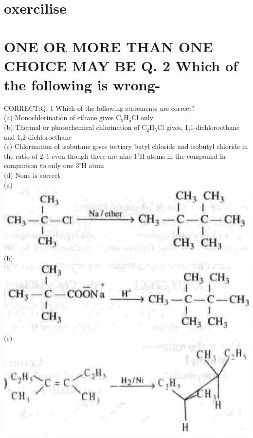 \documentclass[10pt]{article}
\begin{document}
\section*{oxercilise}
\section*{ONE OR MORE THAN ONE CHOICE MAY BE Q. 2 Which of the following is wrong-}
 CORRECT:Q. 1 Which of the following statements are correct?\\
(a) Monochlorination of ethane gives $\mathrm{C}_{2} \mathrm{H}_{5} \mathrm{Cl}$ only\\
(b) Thermal or photochemical chlorination of $\mathrm{C}_{2} \mathrm{H}_{5} \mathrm{Cl}$ gives, 1,1-dichloroethane and 1,2-dichloroethane\\
(c) Chlorination of isobutane gives tertiary butyl chloride and isobutyl chloride in the ratio of $2: 1$ even though there are nine $1^{\circ} \mathrm{H}$ atoms in the compound in comparison to only one $3^{\circ} \mathrm{H}$ atom\\
(d) None is correct\\
(a)\\
\includegraphics[max width=\textwidth, center]{2025_01_28_8470952b98110cec3aabg-234(3)}\\
(b)\\
\includegraphics[max width=\textwidth, center]{2025_01_28_8470952b98110cec3aabg-234(1)}\\
(c)\\
\includegraphics[max width=\textwidth, center]{2025_01_28_8470952b98110cec3aabg-235(3)}\\
\end{document}
